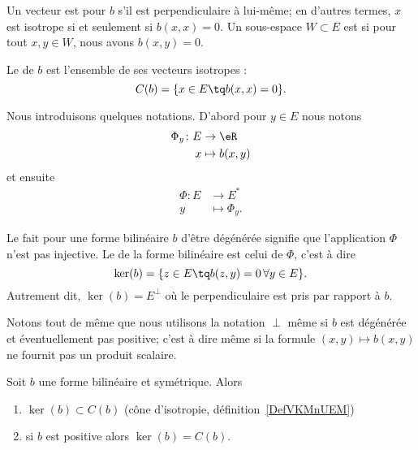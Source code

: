 \begin{definition}[Isotropie]   \label{DefVKMnUEM}
    Un vecteur est  pour \( b\) s'il est perpendiculaire à lui-même; en d'autres termes, \( x\) est isotrope si et seulement si \( b(x,x)=0\). Un sous-espace \( W\subset E\) est  si pour tout \( x,y\in W\), nous avons \( b(x,y)=0\).

    Le  de \( b\) est l'ensemble de ses vecteurs isotropes :
    \begin{equation}
        C(b)=\{ x\in E\tq b(x,x)=0 \}.
    \end{equation}
\end{definition}
Nous introduisons quelques notations. D'abord pour \( y\in E\) nous notons
\begin{equation}
    \begin{aligned}
        \Phi_y\colon E&\to \eR \\
        x&\mapsto b(x,y)
    \end{aligned}
\end{equation}
et ensuite
\begin{equation}
    \begin{aligned}
        \Phi\colon E&\to E^* \\
        y&\mapsto \Phi_y.
    \end{aligned}
\end{equation}
\begin{definition}
    Le fait pour une forme bilinéaire \( b\) d'être dégénérée signifie que l'application \( \Phi\) n'est pas injective. Le  de la forme bilinéaire est celui de \( \Phi\), c'est à dire
    \begin{equation}
        \ker(b)=\{ z\in E\tq b(z,y)=0\,\forall y\in E \}.
    \end{equation}
    Autrement dit, \( \ker(b)=E^{\perp}\) où le perpendiculaire est pris par rapport à \( b\).
\end{definition}
Notons tout de même que nous utilisons la notation \( \perp\) même si \( b\) est dégénérée et éventuellement pas positive; c'est à dire même si la formule \( (x,y)\mapsto b(x,y)\) ne fournit pas un produit scalaire.

\begin{proposition}     \label{PropHIWjdMX}
    Soit \( b\) une forme bilinéaire et symétrique. Alors
    \begin{enumerate}
        \item
            \( \ker(b)\subset C(b)\) (cône d'isotropie, définition~\ref{DefVKMnUEM})
        \item
            si \( b\) est positive alors \( \ker(b)=C(b)\).
    \end{enumerate}
\end{proposition}

